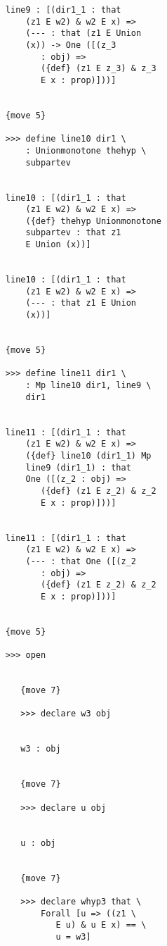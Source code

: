 \documentclass[12pt]{article}
\begin{document}
\begin{verbatim}
                  line9 : [(dir1_1 : that 
                      (z1 E w2) & w2 E x) => 
                      (--- : that (z1 E Union 
                      (x)) -> One ([(z_3 
                         : obj) => 
                         ({def} (z1 E z_3) & z_3 
                         E x : prop)]))]


                  {move 5}

                  >>> define line10 dir1 \
                      : Unionmonotone thehyp \
                      subpartev


                  line10 : [(dir1_1 : that 
                      (z1 E w2) & w2 E x) => 
                      ({def} thehyp Unionmonotone 
                      subpartev : that z1 
                      E Union (x))]


                  line10 : [(dir1_1 : that 
                      (z1 E w2) & w2 E x) => 
                      (--- : that z1 E Union 
                      (x))]


                  {move 5}

                  >>> define line11 dir1 \
                      : Mp line10 dir1, line9 \
                      dir1


                  line11 : [(dir1_1 : that 
                      (z1 E w2) & w2 E x) => 
                      ({def} line10 (dir1_1) Mp 
                      line9 (dir1_1) : that 
                      One ([(z_2 : obj) => 
                         ({def} (z1 E z_2) & z_2 
                         E x : prop)]))]


                  line11 : [(dir1_1 : that 
                      (z1 E w2) & w2 E x) => 
                      (--- : that One ([(z_2 
                         : obj) => 
                         ({def} (z1 E z_2) & z_2 
                         E x : prop)]))]


                  {move 5}

                  >>> open


                     {move 7}

                     >>> declare w3 obj


                     w3 : obj


                     {move 7}

                     >>> declare u obj


                     u : obj


                     {move 7}

                     >>> declare whyp3 that \
                         Forall [u => ((z1 \
                            E u) & u E x) == \
                            u = w3]



\end{verbatim}
\end{document}
